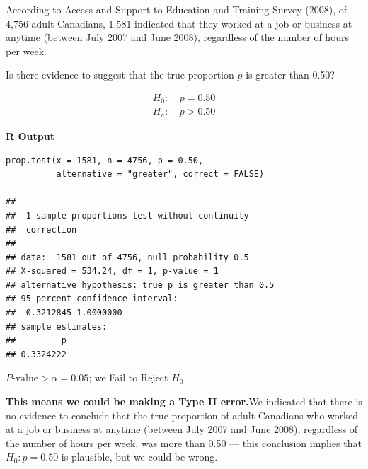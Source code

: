 \begin{example}
According to Access and Support to Education and Training Survey (2008), of 4,756 adult Canadians, 1,581 indicated that they worked at a job or business at anytime (between July 2007 and June 2008), regardless of the number of hours per week.

Is there evidence to suggest that the true proportion $p$ is greater than 0.50?

\begin{align*}
H_0\!:&\ p = 0.50 \\
H_a\!:&\ p > 0.50
\end{align*}


\noindent\textbf{R Output}
\begin{tcolorbox}[colback=gray!10, colframe=black!45, arc=2mm]
\begin{verbatim}
prop.test(x = 1581, n = 4756, p = 0.50,
          alternative = "greater", correct = FALSE)

## 
##  1-sample proportions test without continuity
##  correction
## 
## data:  1581 out of 4756, null probability 0.5
## X-squared = 534.24, df = 1, p-value = 1
## alternative hypothesis: true p is greater than 0.5
## 95 percent confidence interval:
##  0.3212845 1.0000000
## sample estimates:
##         p 
## 0.3324222 
\end{verbatim}
\end{tcolorbox}


\textbf{$P\text{-value} > \alpha = 0.05$}; we Fail to Reject $H_0$.

\textbf{This means we could be making a Type II error.}We indicated that there is no evidence to conclude that the true proportion of adult Canadians who worked at a job or business at anytime (between July 2007 and June 2008), regardless of the number of hours per week, was more than 0.50 — this conclusion implies that $H_0: p = 0.50$ is plausible, but we could be wrong.
\end{example}

